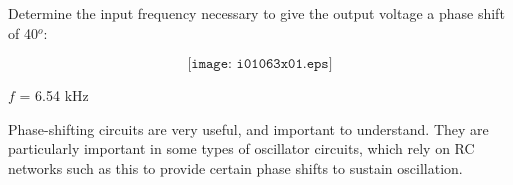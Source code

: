 

Determine the input frequency necessary to give the output voltage a phase shift of 40$^{o}$:

$$\texttt{[image: i01063x01.eps]}$$







$f$ = 6.54 kHz







Phase-shifting circuits are very useful, and important to understand.  They are particularly important in some types of oscillator circuits, which rely on RC networks such as this to provide certain phase shifts to sustain oscillation.




